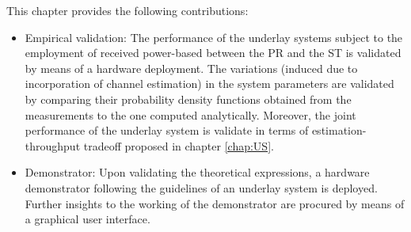 This chapter provides the following contributions:
\begin{itemize}
	\item Empirical validation: The performance of the underlay systems subject to the employment of received power-based between the PR and the ST is validated by means of a hardware deployment. The variations (induced due to incorporation of channel estimation) in the system parameters are validated by comparing their probability density functions obtained from the measurements to the one computed analytically. Moreover, the joint performance of the underlay system is validate in terms of estimation-throughput tradeoff proposed in chapter \ref{chap:US}. %
	\item Demonstrator: Upon validating the theoretical expressions, a hardware demonstrator following the guidelines of an underlay system is deployed. Further insights to the working of the demonstrator are procured by means of a graphical user interface.	
\end{itemize}



